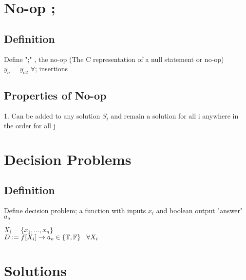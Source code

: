 \documentclass[11pt]{article}
\begin{document}
\section{No-op ;}

\subsection{Definition}
Define ";" , the no-op (The C representation of a null statement or no-op)\\
$y_o$ = $y_{o2}$ $\forall$;  insertions

\subsection{Properties of No-op}
1. Can be added to any solution $S_i$ and remain a solution for all i anywhere in the order for all j






















\newpage
\section{Decision Problems}

\subsection{Definition}
Define decision problem; a function with inputs $x_i$ and boolean output "answer" $a_o$
\begin{center}
$
X_i = \{x_1,...,x_n\}
$
\\ \vspace{2mm}
$
D := f \lbrack X_i \rbrack \rightarrow a_{o} \in \{\mathbb{T}, \mathbb{F}\} \hspace{3mm} \forall X_i
$
\end{center}







\section{Solutions}
\end{document}
